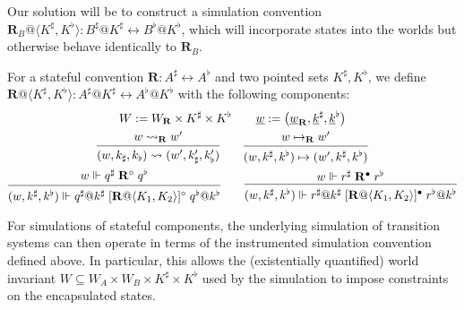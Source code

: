 \documentclass[acmsmall,screen,review,anonymous]{acmart}
\newcommand{\que}{\circ}
\newcommand{\ans}{\bullet}
\newcommand{\intl}[1]{\underline{#1}}
\begin{document}
Our solution will be to construct a simulation convention
$\mathbf{R}_B@\langle K^\sharp, K^\flat \rangle :
 B^\sharp@K^\sharp \leftrightarrow B^\flat@K^\flat$,
which will incorporate states into the worlds
but otherwise behave identically to $\mathbf{R}_B$.

\begin{definition} \label{def:liftsconv} %
For a stateful convention
$\mathbf{R} : A^\sharp \leftrightarrow A^\flat$
and two pointed sets $K^\sharp, K^\flat$, 
we define %
$\mathbf{R}@\langle K^\sharp,K^\flat \rangle :
   A^\sharp@K^\sharp \leftrightarrow A^\flat@K^\flat$
with the following components:
\begin{gather*}
  W := W_\mathbf{R} \times K^\sharp \times K^\flat
  \qquad
  \intl{w} := \big( \intl{w}_\mathbf{R}, \intl{k}^\sharp, \intl{k}^\flat \big)
  \\
 {\begin{prooftree}
    \hypo{w \leadsto_\mathbf{R} w'}
    \infer1{(w, k_\sharp, k_\flat) \leadsto (w', k_\sharp', k_\flat')}
  \end{prooftree}}
  \qquad
 {\begin{prooftree}
    \hypo{w \mapsto_\mathbf{R} w'}
    \infer1{(w, k^\sharp, k^\flat) \mapsto (w', k^\sharp, k^\flat)}
  \end{prooftree}}
  \\
 {\begin{prooftree}
    \hypo{w \Vdash q^\sharp \mathrel{\mathbf{R}^\que}
                   q^\flat}
    \infer1{
      (w, k^\sharp, k^\flat) \Vdash
      q^\sharp@k^\sharp
      \mathrel{[\mathbf{R}@\langle K_1, K_2 \rangle]^\que}
      q^\flat@k^\flat}
  \end{prooftree}}
  \qquad
 {\begin{prooftree}
    \hypo{w \Vdash r^\sharp \mathrel{\mathbf{R}^\ans}
                   r^\flat}
    \infer1{
      (w, k^\sharp, k^\flat) \Vdash
      r^\sharp@k^\sharp
      \mathrel{[\mathbf{R}@\langle K_1, K_2 \rangle]^\ans}
      r^\flat@k^\flat}
  \end{prooftree}}
\end{gather*}
\end{definition}

For simulations of stateful components,
the underlying simulation of transition systems
can then operate in terms
of the instrumented simulation convention defined above.
In particular, this allows
the (existentially quantified) world invariant
$W \subseteq W_A \times W_B \times K^\sharp \times K^\flat$
used by the simulation
to impose constraints on the encapsulated states.
\end{document}
